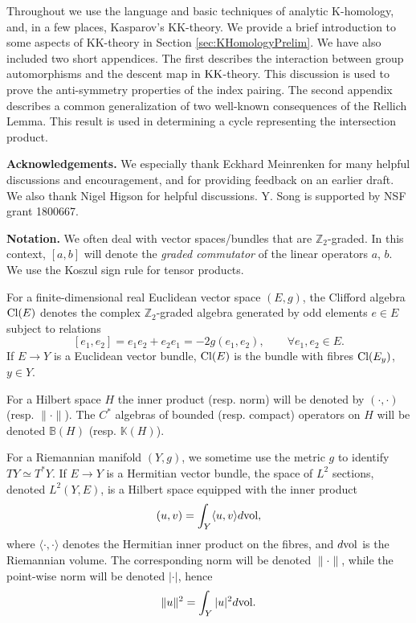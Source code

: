\documentclass[11pt,reqno]{amsart}
\theoremstyle{definition}
\theoremstyle{remark}
\newcommand{\pair}[2]{\langle #1, #2 \rangle}
\def\bZ{\ensuremath{\mathbb{Z}}}
\def\bB{\ensuremath{\mathbb{B}}}
\def\bK{\ensuremath{\mathbb{K}}}
\def\Cl{\ensuremath{\textnormal{Cl}}}
\def\vol{\ensuremath{\textnormal{vol}}}
\def\KK{\ensuremath{\textnormal{KK}}}
\begin{document}
Throughout we use the language and basic techniques of analytic K-homology, and, in a few places, Kasparov's KK-theory.  We provide a brief introduction to some aspects of KK-theory in Section \ref{sec:KHomologyPrelim}.  We have also included two short appendices.  The first describes the interaction between group automorphisms and the descent map in $\KK$-theory.  This discussion is used to prove the anti-symmetry properties of the index pairing.  The second appendix describes a common generalization of two well-known consequences of the Rellich Lemma.  This result is used in determining a cycle representing the intersection product.

\vspace{0.3cm}

\noindent \textbf{Acknowledgements.} We especially thank Eckhard Meinrenken for many helpful discussions and encouragement, and for providing feedback on an earlier draft.  We also thank Nigel Higson for helpful discussions.  Y. Song is supported by NSF grant 1800667.

\vspace{0.3cm}

\noindent \textbf{Notation.}
We often deal with vector spaces/bundles that are $\bZ_2$-graded.  In this context, $[a,b]$ will denote the \emph{graded commutator} of the linear operators $a$, $b$.  We use the Koszul sign rule for tensor products.

For a finite-dimensional real Euclidean vector space $(E,g)$, the Clifford algebra $\Cl(E)$ denotes the complex $\bZ_2$-graded algebra generated by odd elements $e \in E$ subject to relations
\[ [e_1,e_2]=e_1e_2+e_2e_1=-2g(e_1,e_2), \qquad \forall e_1,e_2 \in E.\]
If $E \rightarrow Y$ is a Euclidean vector bundle, $\Cl(E)$ is the bundle with fibres $\Cl(E_y)$, $y \in Y$.

For a Hilbert space $H$ the inner product (resp. norm) will be denoted by $(\cdot,\cdot)$ (resp. $\|\cdot \|$).  The $C^\ast$ algebras of bounded (resp. compact) operators on $H$ will be denoted $\bB(H)$ (resp. $\bK(H)$). 

For a Riemannian manifold $(Y,g)$, we sometime use the metric $g$ to identify $TY \simeq T^\ast Y$.  If $E \rightarrow Y$ is a Hermitian vector bundle, the space of $L^2$ sections, denoted $L^2(Y,E)$, is a Hilbert space equipped with the inner product
\[ (u,v)=\int_Y \pair{u}{v} d\vol,\]
where $\pair{\cdot}{\cdot}$ denotes the Hermitian inner product on the fibres, and $d\vol$ is the Riemannian volume.  The corresponding norm will be denoted $\|\cdot \|$, while the point-wise norm will be denoted $|\cdot |$, hence
\[ \|u\|^2=\int_Y |u|^2 d\vol.\]
\end{document}
